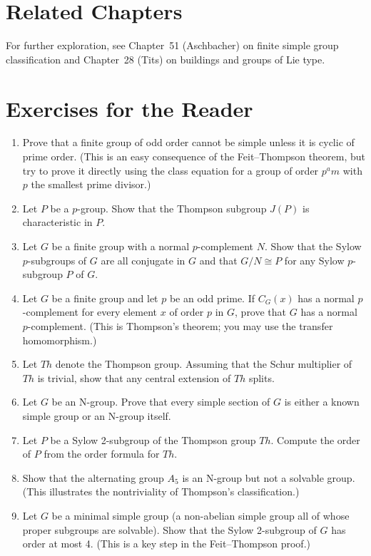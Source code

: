 \section{Related Chapters}
For further exploration, see Chapter~51 (Aschbacher) on finite simple group classification and Chapter~28 (Tits) on buildings and groups of Lie type.

\section*{Exercises for the Reader}

\begin{enumerate}
\item [B] Prove that a finite group of odd order cannot be simple unless it is cyclic of prime order. (This is an easy consequence of the Feit--Thompson theorem, but try to prove it directly using the class equation for a group of order \(p^a m\) with \(p\) the smallest prime divisor.)
\item [B] Let \(P\) be a \(p\)-group. Show that the Thompson subgroup \(J(P)\) is characteristic in \(P\).
\item [B] Let \(G\) be a finite group with a normal \(p\)-complement \(N\). Show that the Sylow \(p\)-subgroups of \(G\) are all conjugate in \(G\) and that \(G/N \cong P\) for any Sylow \(p\)-subgroup \(P\) of \(G\).
\item [I] Let \(G\) be a finite group and let \(p\) be an odd prime. If \(C_G(x)\) has a normal \(p\)-complement for every element \(x\) of order \(p\) in \(G\), prove that \(G\) has a normal \(p\)-complement. (This is Thompson's theorem; you may use the transfer homomorphism.)
\item [I] Let \(Th\) denote the Thompson group. Assuming that the Schur multiplier of \(Th\) is trivial, show that any central extension of \(Th\) splits.
\item [I] Let \(G\) be an N-group. Prove that every simple section of \(G\) is either a known simple group or an N-group itself.
\item [I] Let \(P\) be a Sylow 2-subgroup of the Thompson group \(Th\). Compute the order of \(P\) from the order formula for \(Th\).
\item [B] Show that the alternating group \(A_5\) is an N-group but not a solvable group. (This illustrates the nontriviality of Thompson's classification.)
\item [A] Let \(G\) be a minimal simple group (a non-abelian simple group all of whose proper subgroups are solvable). Show that the Sylow 2-subgroup of \(G\) has order at most 4. (This is a key step in the Feit--Thompson proof.)

\end{enumerate}
